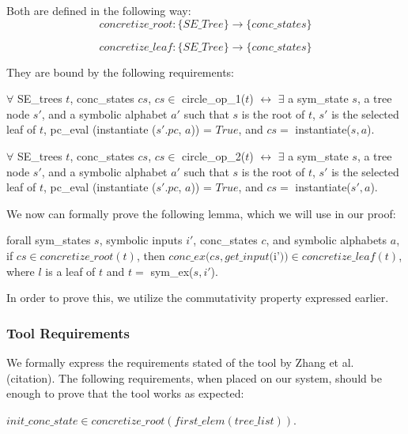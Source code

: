 Both are defined in the following way: 
$$concretize\_root : \{ SE\_Tree \} \rightarrow \{conc\_states\}$$

$$concretize\_leaf : \{ SE\_Tree \} \rightarrow \{conc\_states\}$$

They are bound by the following requirements:

\begin{axiom}
$\forall$ SE\_trees $t$,  conc\_states $cs$,
$cs \in$ circle\_op\_1($t$) $\leftrightarrow$ 
$\exists$ a sym\_state $s$, a tree node $s'$, and a symbolic alphabet $a'$ such that
$s$ is the root of $t$, $s'$ is the selected leaf of $t$, 
pc\_eval (instantiate ($s'.pc$, $a$)) = $True$, and 
$cs =$ instantiate($s, a$).
\end{axiom}

\begin{axiom}
$\forall$ SE\_trees $t$,  conc\_states $cs$,
$cs \in$ circle\_op\_2($t$) $\leftrightarrow$ 
$\exists$ a sym\_state $s$, a tree node $s'$, and a symbolic alphabet $a'$ such that
$s$ is the root of $t$, $s'$ is the selected leaf of $t$, 
pc\_eval (instantiate ($s'.pc$, $a$)) = $True$, and 
$cs =$ instantiate($s', a$).
\end{axiom}


We now can formally prove the following lemma, which we will use in our proof:
\begin{lemma} \label{cop}
forall sym\_states $s$, symbolic inputs $i'$, conc\_states $c$, and symbolic alphabets $a$,
if $cs \in concretize\_root(t)$,
then 
$conc\_ex(cs, get\_input ($i'$)) \in concretize\_leaf(t)$,
where $l$ is a leaf of $t$ and $t = $ sym\_ex($s, i'$).
\end{lemma}

In order to prove this, we utilize the commutativity property expressed earlier.


\subsubsection{Tool Requirements}
We formally express the requirements stated of the tool by Zhang et al. (citation).
The following requirements, when placed on our system, should be enough to prove that the tool works as expected:

\setcounter{property}{0}
\renewcommand{\theproperty}{Z.\arabic{property}}
\begin{property}
  \label{prop:startinit}
$init\_conc\_state \in concretize\_root(first\_elem (tree\_list))$.
\end{property}

